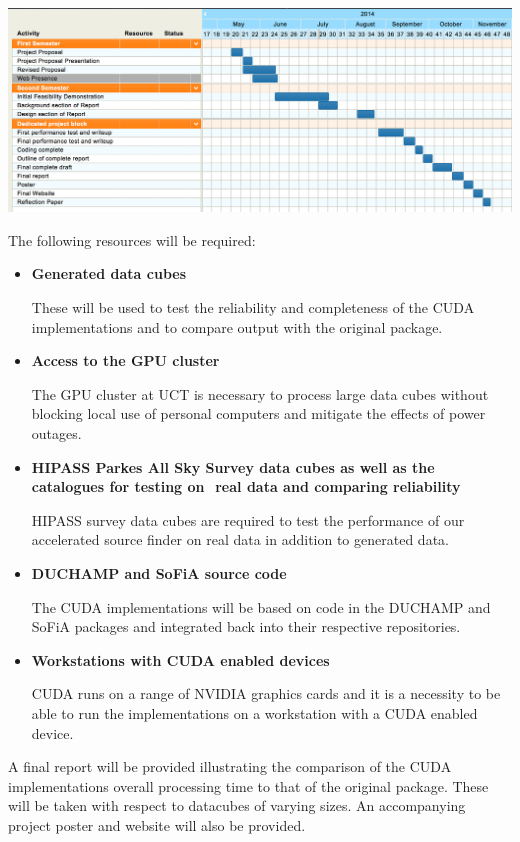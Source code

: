 \documentclass[prodmode,acmtecs]{acmsmall} \usepackage[ruled]{algorithm2e}
\begin{document}
\includegraphics[scale=.4]{gantt}

The following resources will be required:

\begin{itemize}
    \item 
        \textbf{Generated data cubes }

        These will be used to test the reliability and completeness of the CUDA implementations and to compare output with the original package.
    \item
        \textbf{Access to the GPU cluster}

        The GPU cluster at UCT is necessary to process large data cubes without blocking local use of personal computers and mitigate the effects of power outages.
    \item
        \textbf{HIPASS Parkes All Sky Survey data cubes as well as the catalogues for testing on  real data and comparing reliability}

        HIPASS survey data cubes are required to test the performance of our accelerated source finder on real data in addition to generated data.
    \item
        \textbf{DUCHAMP and SoFiA source code}

        The CUDA implementations will be based on code in the DUCHAMP and SoFiA packages and integrated back into their respective repositories.
    \item
        \textbf{Workstations with CUDA enabled devices}

        CUDA runs on a range of NVIDIA graphics cards and it is a necessity to be able to run the implementations on a workstation with a CUDA enabled device.
\end{itemize}

A final report will be provided illustrating the comparison of the CUDA implementations overall processing time to that of the original package. These will be taken with respect to datacubes of varying sizes. An accompanying project poster and website will also be provided.
\end{document}
